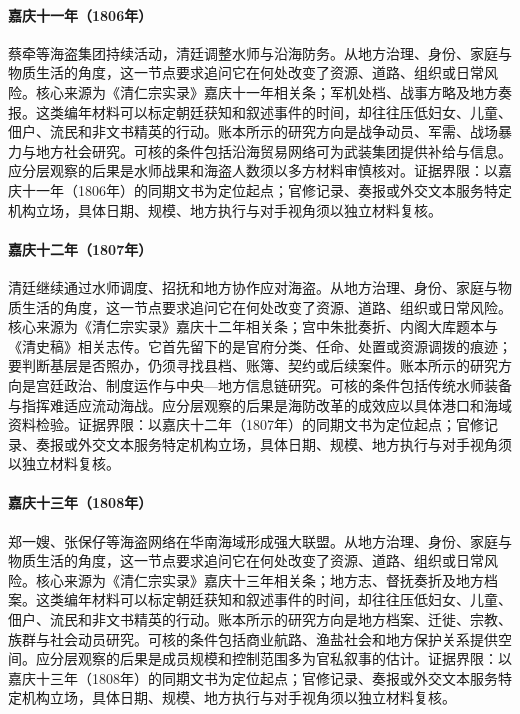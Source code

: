 \hypertarget{social:EQ-1806-TSAI-QIAN-PIRACY}{}\paragraph{嘉庆十一年（1806年）}蔡牵等海盗集团持续活动，清廷调整水师与沿海防务。从地方治理、身份、家庭与物质生活的角度，这一节点要求追问它在何处改变了资源、道路、组织或日常风险。核心来源为《清仁宗实录》嘉庆十一年相关条；军机处档、战事方略及地方奏报。这类编年材料可以标定朝廷获知和叙述事件的时间，却往往压低妇女、儿童、佃户、流民和非文书精英的行动。账本所示的研究方向是战争动员、军需、战场暴力与地方社会研究。可核的条件包括沿海贸易网络可为武装集团提供补给与信息。应分层观察的后果是水师战果和海盗人数须以多方材料审慎核对。证据界限：以嘉庆十一年（1806年）的同期文书为定位起点；官修记录、奏报或外交文本服务特定机构立场，具体日期、规模、地方执行与对手视角须以独立材料复核。
\hypertarget{social:EQ-1807-COASTAL-NAVAL-REFORM}{}\paragraph{嘉庆十二年（1807年）}清廷继续通过水师调度、招抚和地方协作应对海盗。从地方治理、身份、家庭与物质生活的角度，这一节点要求追问它在何处改变了资源、道路、组织或日常风险。核心来源为《清仁宗实录》嘉庆十二年相关条；宫中朱批奏折、内阁大库题本与《清史稿》相关志传。它首先留下的是官府分类、任命、处置或资源调拨的痕迹；要判断基层是否照办，仍须寻找县档、账簿、契约或后续案件。账本所示的研究方向是宫廷政治、制度运作与中央—地方信息链研究。可核的条件包括传统水师装备与指挥难适应流动海战。应分层观察的后果是海防改革的成效应以具体港口和海域资料检验。证据界限：以嘉庆十二年（1807年）的同期文书为定位起点；官修记录、奏报或外交文本服务特定机构立场，具体日期、规模、地方执行与对手视角须以独立材料复核。
\hypertarget{social:EQ-1808-PIRATE-ALLIANCES}{}\paragraph{嘉庆十三年（1808年）}郑一嫂、张保仔等海盗网络在华南海域形成强大联盟。从地方治理、身份、家庭与物质生活的角度，这一节点要求追问它在何处改变了资源、道路、组织或日常风险。核心来源为《清仁宗实录》嘉庆十三年相关条；地方志、督抚奏折及地方档案。这类编年材料可以标定朝廷获知和叙述事件的时间，却往往压低妇女、儿童、佃户、流民和非文书精英的行动。账本所示的研究方向是地方档案、迁徙、宗教、族群与社会动员研究。可核的条件包括商业航路、渔盐社会和地方保护关系提供空间。应分层观察的后果是成员规模和控制范围多为官私叙事的估计。证据界限：以嘉庆十三年（1808年）的同期文书为定位起点；官修记录、奏报或外交文本服务特定机构立场，具体日期、规模、地方执行与对手视角须以独立材料复核。
